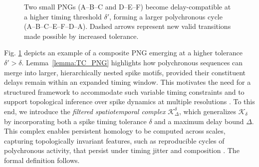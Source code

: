 \documentclass[lettersize,journal]{IEEEtran}
\begin{document}
\begin{figure}[h]
\centering
{}
\caption{Two small PNGs (A–B–C and D–E–F) become delay-compatible at a higher timing threshold \( \delta' \), forming a larger polychronous cycle (A–B–C–E–F–D–A). Dashed arrows represent new valid transitions made possible by increased tolerance.}
\label{fig:two_PNG}
\end{figure}

Fig. \ref{fig:two_PNG} depicts an example of a composite PNG emerging at a higher tolerance $\delta'>\delta$. Lemma~\ref{lemma:TC_PNG} highlights how polychronous sequences can merge into larger, hierarchically nested spike motifs, provided their constituent delays remain within an expanded timing window. This motivates the need for a structured framework to accommodate such variable timing constraints and to support topological inference over spike dynamics at multiple resolutions \cite{lin2024topology}. 
To this end, we introduce the \emph{filtered spatiotemporal complex} \( \mathcal{K}_\Delta^\delta \), which generalizes \( \mathcal{K}_\delta \) by incorporating both a spike timing tolerance \( \delta \) and a maximum delay bound \( \Delta \). This complex enables persistent homology to be computed across scales, capturing topologically invariant features, such as reproducible cycles of polychronous activity, that persist under timing jitter and composition \cite{lutgehetmann2020computing}. The formal definition follows.
\end{document}
